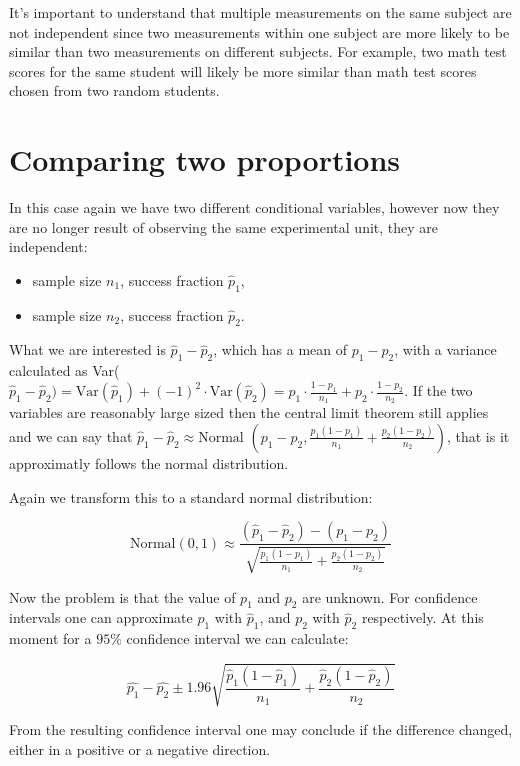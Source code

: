 It's important to understand that multiple measurements on the same subject are
not independent since two measurements within one subject are more likely to be
similar than two measurements on different subjects. For example, two math test
scores for the same student will likely be more similar than math test scores
chosen from two random students.

\section{Comparing two proportions}

In this case again we have two different conditional variables, however now they
are no longer result of observing the same experimental unit, they are
independent:

\begin{itemize}
  \item sample size $n_1$, success fraction $\hat{p}_1$,
  \item sample size $n_2$, success fraction $\hat{p}_2$.
\end{itemize}

What we are interested is $\hat{p}_1 -\hat{p}_2$, which has a mean of $p_1-p_2$,
with a variance calculated as Var($\hat{p}_1-\hat{p}_2)=\mbox{Var}(\hat{p}_1) +
(-1)^2 \cdot
\mbox{Var}(\hat{p}_2)=p_1\cdot\frac{1-p_1}{n_1}+p_2\cdot\frac{1-p_2}{n_2}$. If
the two variables are reasonably large sized then the central limit theorem
still applies and we can say that $\hat{p}_1 - \hat{p}_2 \approx \mbox{Normal}$
$\left(p_1-p_2, \frac{p_1(1-p_1)}{n_1}+\frac{p_2(1-p_2)}{n_2}\right)$, that is
it approximatly follows the normal distribution. 

Again we transform this to a standard normal distribution:

\[ \mbox{Normal}(0,1) \approx \frac{(\hat{p}_1 - \hat{p}_2) - (p_1 -
p_2)}{\sqrt{\frac{p_1(1-p_1)}{n_1}+\frac{p_2(1-p_2)}{n_2}}}
\]

Now the problem is that the value of $p_1$ and $p_2$ are unknown. For confidence
intervals one can approximate $p_1$ with $\hat{p}_1$, and $p_2$ with $\hat{p}_2$
respectively. At this moment for a $95\%$ confidence interval we can calculate:

\[ \hat{p_1} - \hat{p_2} \pm 1.96
\sqrt{\frac{\hat{p}_1(1-\hat{p}_1)}{n_1}+\frac{\hat{p}_2(1-\hat{p}_2)}{n_2}} \]

From the resulting confidence interval one may conclude if the difference
changed, either in a positive or a negative direction.

